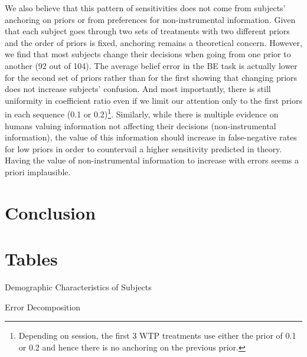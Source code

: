 \documentclass[12pt,a4paper]{article}
\begin{document}
We also believe that this pattern of sensitivities does not come from subjects' anchoring on priors or from preferences for non-instrumental information. Given that each subject goes through two sets of treatments with two different priors and the order of priors is fixed, anchoring remains a theoretical concern. However, we find that most subjects change their decisions when going from one prior to another (92 out of 104). The average belief error in the BE task is actually lower for the second set of priors rather than for the first showing that changing priors does not increase subjects' confusion. And most importantly, there is still uniformity in coefficient ratio even if we limit our attention only to the first priors in each sequence (0.1 or 0.2)\footnote{Depending on session, the first 3 WTP treatments use either the prior of 0.1 or 0.2 and hence there is no anchoring on the previous prior.}.  Similarly, while there is multiple evidence on humans valuing information not affecting their decisions (non-instrumental information), the value of this information should increase in false-negative rates for low priors in order to countervail a higher sensitivity predicted in theory. Having the value of non-instrumental information to increase with errors seems a priori implausible.





 

\vspace{20pt}

\section{Conclusion}


\clearpage





\appendix

\newpage
\section{Tables}


\begin{table}[h!]
\caption{Demographic Characteristics of Subjects} \label{summ_tab}

\end{table}

\begin{table}[h!]
\caption{Error Decomposition} \label{belief_decomposition}

\end{table}
\end{document}
